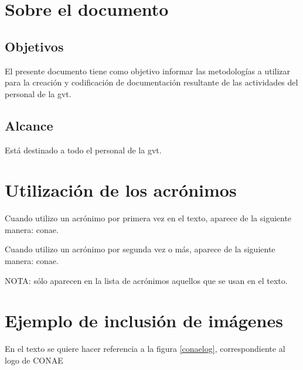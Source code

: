 \documentclass{GVT_CONAE_Class}
\begin{document}
\section{Sobre el documento}

\subsection{Objetivos}
El presente documento tiene como objetivo informar las metodologías a utilizar para la
creación y codificación de documentación resultante de las actividades del personal de
la \gls{gvt}.

\subsection{Alcance}
Está destinado a todo el personal de la \gls{gvt}.

\printglossary[type=\acronymtype, numberedsection, title=Lista de acrónimos y abreviaturas]

\section{Utilización de los acrónimos}

Cuando utilizo un acrónimo por primera vez en el texto, aparece de la siguiente manera: \gls{conae}.

Cuando utilizo un acrónimo por segunda vez o más, aparece de la siguiente manera: \gls{conae}.

NOTA: sólo aparecen en la lista de acrónimos aquellos que se usan en el texto.


\section{Ejemplo de inclusión de imágenes}


En el texto se quiere hacer referencia a la figura \ref{conaelog}, correspondiente al logo de
CONAE\\
\end{document}
